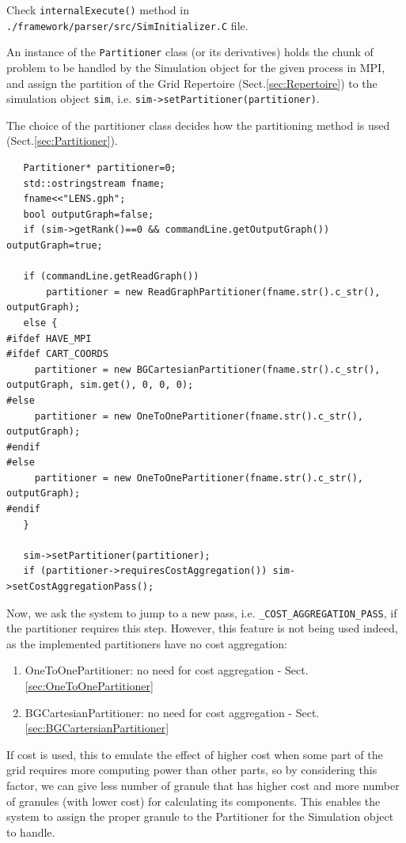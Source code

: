 Check \verb!internalExecute()! method in
\verb!./framework/parser/src/SimInitializer.C! file.

An instance of the \verb!Partitioner! class (or its derivatives) holds the 
chunk of problem to be handled by the Simulation object for the given process
in MPI, and assign the partition of the Grid Repertoire
(Sect.\ref{sec:Repertoire}) to the simulation object \verb!sim!, i.e. 
\verb!sim->setPartitioner(partitioner)!. 

The choice of the partitioner class decides how the partitioning method is used
(Sect.\ref{sec:Partitioner}).

{\small
\begin{lstlisting}
   Partitioner* partitioner=0;
   std::ostringstream fname;
   fname<<"LENS.gph";
   bool outputGraph=false;
   if (sim->getRank()==0 && commandLine.getOutputGraph()) outputGraph=true;

   if (commandLine.getReadGraph()) 
       partitioner = new ReadGraphPartitioner(fname.str().c_str(), outputGraph);
   else {                                                                                                                                                                                              
#ifdef HAVE_MPI
#ifdef CART_COORDS
     partitioner = new BGCartesianPartitioner(fname.str().c_str(), outputGraph, sim.get(), 0, 0, 0);
#else
     partitioner = new OneToOnePartitioner(fname.str().c_str(), outputGraph);
#endif
#else
     partitioner = new OneToOnePartitioner(fname.str().c_str(), outputGraph);
#endif
   }
   
   sim->setPartitioner(partitioner);
   if (partitioner->requiresCostAggregation()) sim->setCostAggregationPass();
\end{lstlisting}
}

Now, we ask the system to jump to a new pass, i.e.
\verb!_COST_AGGREGATION_PASS!, if the partitioner requires this step. However,
this feature is not being used indeed, as the implemented partitioners have no
cost aggregation:

\begin{enumerate}
  \item OneToOnePartitioner: no need for cost aggregation -
  Sect.\ref{sec:OneToOnePartitioner}
  
  
  \item BGCartesianPartitioner: no need for cost aggregation -
  Sect.\ref{sec:BGCartersianPartitioner}
\end{enumerate}


If cost is used, this to emulate the effect of higher cost when some part of the
grid requires more computing power than other parts, so by considering this
factor, we can give less number of granule that has higher cost and more number
of granules (with lower cost) for calculating its components. This enables the
system to assign the proper granule to the Partitioner for the Simulation object
to handle.

